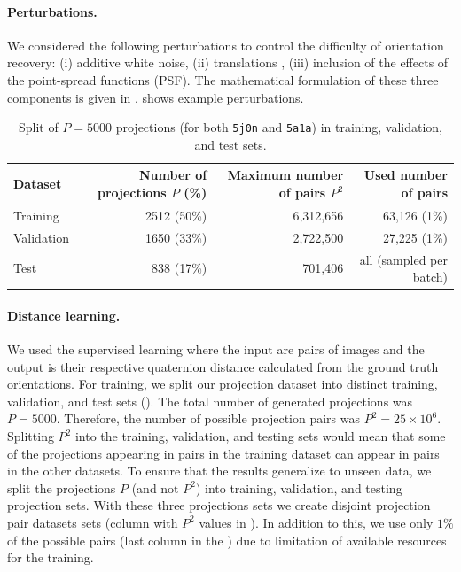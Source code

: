 \paragraph{Perturbations.}
We considered the following perturbations to control the difficulty of orientation recovery: (i) additive white noise, (ii) translations , (iii) inclusion of the effects of the point-spread functions (PSF).
The mathematical formulation of these three components is given in .
 shows example perturbations.

\begin{table}[ht!]
    \centering
    \begin{tabular}{lrrr}
        \toprule
        Dataset & Number of projections $P$ (\%) & Maximum number of pairs $P^2$ & Used number of pairs \\
        \midrule
        Training & 2512 (50\%) & 6,312,656 & 63,126 (1\%) \\
        Validation & 1650 (33\%) & 2,722,500 & 27,225 (1\%) \\
        Test & 838 (17\%) & 701,406 & all (sampled per batch) \\
        \bottomrule
    \end{tabular}
    \caption{
        Split of $P=5000$ projections (for both \texttt{5j0n} and \texttt{5a1a}) in training, validation, and test sets.
    }\label{tab:dataset}
\end{table}

\paragraph{Distance learning.}
We used the supervised learning where the input are pairs of images and the output is their respective quaternion distance calculated from the ground truth orientations.
For training, we split our projection dataset into distinct training, validation, and test sets ().
The total number of generated projections was $P = 5000$.
Therefore, the number of possible projection pairs was $P^2 = 25 \times 10^6$.
Splitting $P^2$ into the training, validation, and testing sets would mean that some of the projections appearing in pairs in the training dataset can appear in pairs in the other datasets.
To ensure that the results generalize to unseen data, we split the projections $P$ (and not $P^2$) into training, validation, and testing projection sets.
With these three projections sets we create disjoint projection pair datasets sets (column with $P^2$ values in ).
In addition to this, we use only $1\%$ of the possible pairs (last column in the ) due to limitation of available resources for the training.


